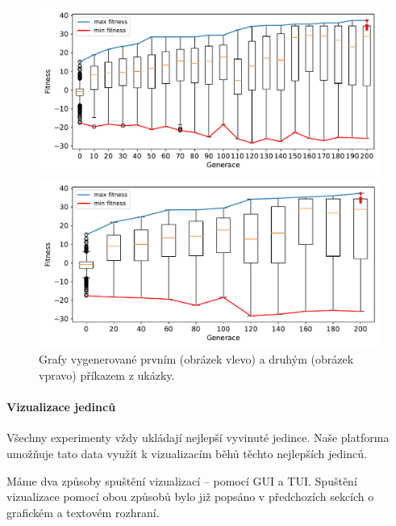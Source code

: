 \begin{figure}[h!]
    \centering
    \begin{minipage}{0.5\textwidth}
        \centering
        \includegraphics[width=1\textwidth]{../img/experiment2_serial_10ticks.pdf}
    \end{minipage}%
    \begin{minipage}{0.5\textwidth}
        \centering
        \includegraphics[width=1\textwidth]{../img/experiment2_serial_20ticks.pdf}
    \end{minipage}
    \caption{Grafy vygenerované prvním (obrázek vlevo) a druhým (obrázek vpravo) příkazem z
    ukázky.}
\end{figure}

\paragraph{Vizualizace jedinců} \label{doc_23_visualization}
Všechny experimenty vždy ukládají nejlepší vyvinuté jedince. Naše platforma
umožňuje tato data využít k vizualizacím běhů těchto nejlepších jedinců. 

Máme dva způsoby spuštění vizualizací -- pomocí GUI a TUI. Spuštění
vizualizace pomocí obou způsobů bylo již popsáno v předchozích sekcích o
grafickém a textovém rozhraní. 

